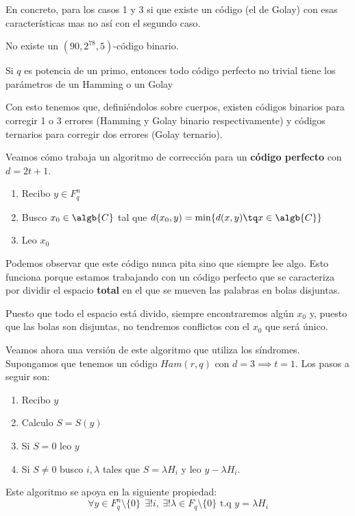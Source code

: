 En concreto, para los casos 1 y 3 si que existe un código (el de Golay) con esas características mas no así con el segundo caso.

\begin{theorem}
No existe un $(90,2^{78},5)$-código binario.
\end{theorem}

\begin{theorem}
Si $q$ es potencia de un primo, entonces todo código perfecto no trivial tiene los parámetros de un Hamming o un Golay
\end{theorem}

Con esto tenemos que, definiéndolos sobre cuerpos, existen códigos binarios para corregir 1 o 3 errores (Hamming y Golay binario respectivamente) y códigos ternarios para corregir dos errores (Golay ternario).

Veamos cómo trabaja un algoritmo de corrección para un \textbf{código perfecto} con $d=2t+1$.

\begin{enumerate}
\item Recibo $y\in F_q^n$
\item Busco $x_0 \in \algb{C}$ tal que $d(x_0,y)=\min\{d(x,y)\tq x \in \algb{C}\}$
\item Leo $x_0$
\end{enumerate}

Podemos observar que este código nunca pita sino que siempre lee algo. Esto funciona porque estamos trabajando con un código perfecto que se caracteriza por dividir el espacio \textbf{total} en el que se mueven las palabras en bolas disjuntas.

Puesto que todo el espacio está divido, siempre encontraremos algún $x_0$ y, puesto que las bolas son disjuntas, no tendremos conflictos con el $x_0$ que será único.

Veamos ahora una versión de este algoritmo que utiliza los síndromes. Supongamos que tenemos un código $Ham(r,q)$ con $d=3 \implies t=1$. Los pasos a seguir son:

\begin{enumerate}
\item Recibo $y$
\item Calculo $S=S(y)$
\item Si $S=0$ leo $y$
\item Si $S\neq 0$ busco $i,λ$ tales que $S=λH_i$ y leo $y-λH_i$.
\end{enumerate}

Este algoritmo se apoya en la siguiente propiedad:
\[\forall y \in F_q^n\setminus \{0\} \ \ \exists ! i, \ \exists ! λ\in F_q\setminus\{0\} \text{ t.q } y=λH_i\]

